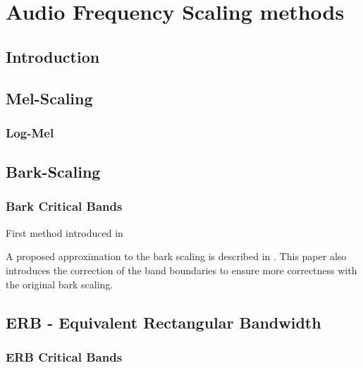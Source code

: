 \chapter{Audio Frequency Scaling methods}
\section{Introduction}


\section{Mel-Scaling}
\subsection{Log-Mel}

\section{Bark-Scaling}


\subsection{Bark Critical Bands}

First method introduced in \cite{doi:10.1121/1.1908630}


A proposed approximation to the bark scaling is described in 
\cite{doi:10.1121/1.399849}. This paper also introduces the 
correction of the band boundaries to ensure more 
correctness with the original bark scaling.




\section{ERB - Equivalent Rectangular Bandwidth}
\subsection{ERB Critical Bands}